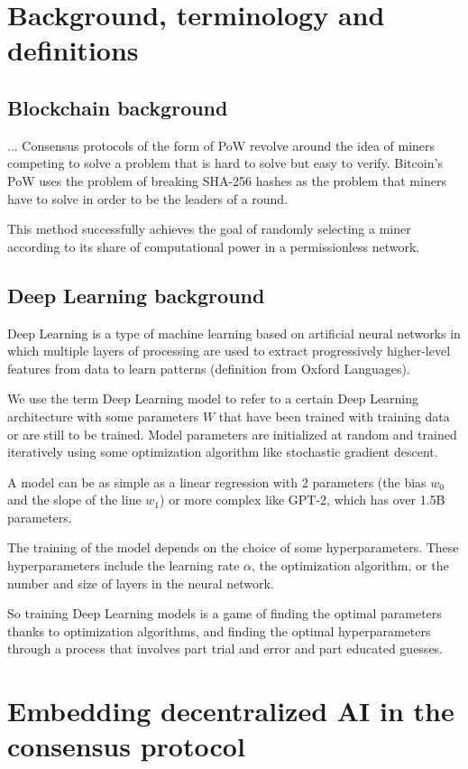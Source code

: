\documentclass[conference]{IEEEtran}
\begin{document}
\section{Background, terminology and definitions}
\subsection{Blockchain background}
...
Consensus protocols of the form of PoW revolve around the idea of miners competing to solve a problem that is hard to solve but easy to verify. Bitcoin's PoW uses the problem of breaking SHA-256 hashes as the problem that miners have to solve in order to be the leaders of a round.

This method successfully achieves the goal of randomly selecting a miner according to its share of computational power in a permissionless network.

\subsection{Deep Learning background}
Deep Learning is a type of machine learning based on artificial neural networks in which multiple layers of processing are used to extract progressively higher-level features from data to learn patterns (definition from Oxford Languages).

We use the term Deep Learning model to refer to a certain Deep Learning architecture with some parameters $W$ that have been trained with training data or are still to be trained. Model parameters are initialized at random and trained iteratively using some optimization algorithm like stochastic gradient descent.

A model can be as simple as a linear regression with 2 parameters (the bias $w_0$ and the slope of the line $w_1$) or more complex like GPT-2, which has over 1.5B parameters\cite{b5}.

The training of the model depends on the choice of some hyperparameters. These hyperparameters include the learning rate $\alpha$, the optimization algorithm, or the number and size of layers in the neural network.

So training Deep Learning models is a game of finding the optimal parameters thanks to optimization algorithms, and finding the optimal hyperparameters through a process that involves part trial and error and part educated guesses.

\section{Embedding decentralized AI in the consensus protocol}
\end{document}
